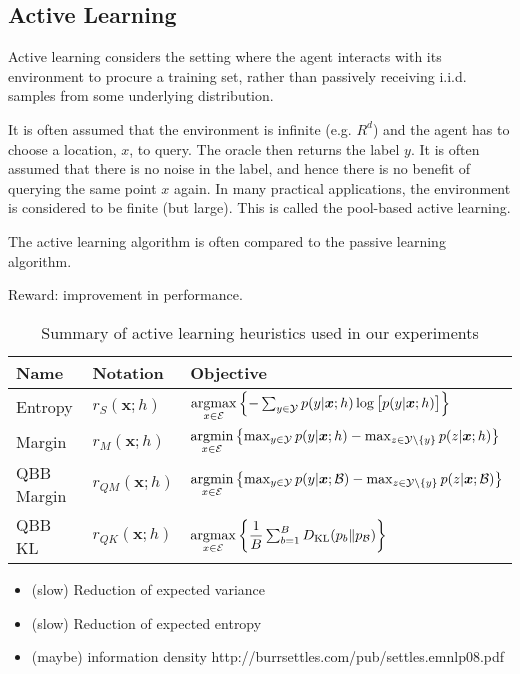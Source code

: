 \documentclass[fleqn,10pt,lineno]{wlpeerj} %
\newcommand{\B}{\mathcal{B}}
\newcommand{\Y}{\mathcal{Y}}
\newcommand{\Ecal}{\mathcal{E}}
\newcommand*{\argmin}{\operatornamewithlimits{argmin}\limits}
\newcommand*{\argmax}{\operatornamewithlimits{argmax}\limits}
\begin{document}
\subsection*{Active Learning}

Active learning considers the setting where the agent interacts with
its environment to procure a training set, rather than passively
receiving i.i.d. samples from some underlying distribution.

It is often assumed that the environment is infinite (e.g. $R^d$) and
the agent has to choose a location, $x$, to query. The oracle then returns
the label $y$. It is often assumed that there is no noise in the label,
and hence there is no benefit of querying the same point $x$ again. In
many practical applications, the environment is considered to be
finite (but large). This is called the pool-based active learning.

The active learning algorithm is often compared to the passive
learning algorithm.

Reward: improvement in performance.

\begin{table}[h]
	\caption {Summary of active learning heuristics used in our experiments} \label{tab:heuristics}
	\centering
	\begin{tabular}{lll}
		\toprule
		{Name}  & Notation &  Objective  \\
		\midrule
		Entropy & $r_S(\bm{x}; h)$
			& $\argmax_{x \in \Ecal} \left\{-\sum_{y \in \Y} p(y | \bm{x}; h)
            \log \big[ p(y | \bm{x}; h) \big] \right\}$
			\\[2ex]
		Margin & $r_M(\bm{x}; h)$
			& $\argmin_{x \in \Ecal} \left\{ \max_{y \in \Y} p(y | \bm{x}; h) -
            \max_{z \in \Y \setminus \{y\}} p(z | \bm{x}; h)  \right\}$
			\\[2ex]
		QBB Margin & $r_{QM}(\bm{x}; h)$
			& $\argmin_{x \in \Ecal} \left\{ \max_{y \in \Y} p(y | \bm{x}; \B) -
            \max_{z \in \Y \setminus \{y\}} p(z | \bm{x}; \B)  \right\}$
			\\[2ex]
		QBB KL & $r_{QK}(\bm{x}; h)$
			& $\argmax_{x \in \Ecal} \left\{ \dfrac{1}{B}
               \sum_{b=1}^B D_{\mathrm{KL}}(p_b\|p_\B) \right\}$
			\\
		\bottomrule
	\end{tabular}
\end{table}



\begin{itemize}
  \item (slow) Reduction of expected variance
  \item (slow) Reduction of expected entropy
  \item (maybe) information density http://burrsettles.com/pub/settles.emnlp08.pdf
\end{itemize}
\end{document}
